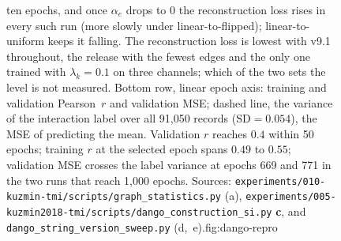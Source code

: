 \begin{figure}[t]
{ten epochs, and once $\alpha_e$ drops to 0 the reconstruction loss rises in every such run
(more slowly under linear-to-flipped); linear-to-uniform keeps it falling. The
reconstruction loss is lowest with v9.1 throughout, the release with the fewest edges and
the only one trained with $\lambda_k=0.1$ on three channels; which of the two sets the level
is not measured. Bottom row, linear epoch axis: training and validation Pearson~$r$ and
validation MSE; dashed line, the variance of the interaction label over all 91,050 records
($\mathrm{SD}=0.054$), the MSE of predicting the mean. Validation $r$ reaches $0.4$ within
50 epochs; training $r$ at the selected epoch spans $0.49$ to $0.55$; validation MSE crosses
the label variance at epochs 669 and 771 in the two runs that reach 1,000 epochs. Sources:
\texttt{experiments/010-kuzmin-tmi/scripts/graph\_statistics.py} (a),
\texttt{experiments/005-kuzmin2018-tmi/scripts/dango\_construction\_si.py} \textbf{c}, and
\texttt{dango\_string\_version\_sweep.py} (d,~e).}{fig:dango-repro}
\end{figure}


